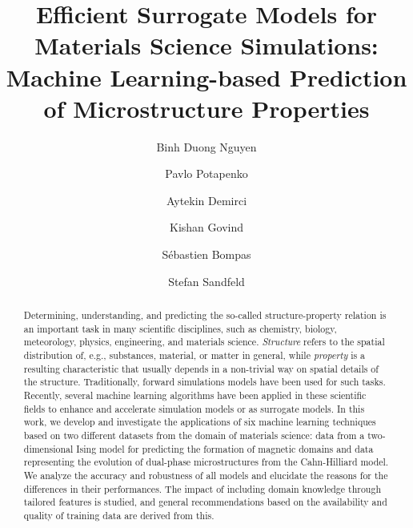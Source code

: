 \documentclass[11pt, authoryear]{elsarticle}
\begin{document}
	\begin{frontmatter}
		\title{%
			Efficient Surrogate Models for Materials Science Simulations: 
			Machine Learning-based Prediction of Microstructure Properties
		}
		
		\author[fzj,one]{Binh Duong Nguyen}
		\author[fzj,two]{Pavlo Potapenko}
		\author[fzj,three]{Aytekin Demirci}
		\author[fzj,fourth]{Kishan Govind}
		\author[fzj,fifth]{S\'ebastien Bompas}
		\author[fzj,rwth,corr]{Stefan Sandfeld}				
		
		\address[fzj]{%
			Institute for Advanced Simulations -- Materials Data Science and Informatics 
			(IAS-9), Forschungszentrum J\"ulich GmbH, 52425 J\"ulich, Germany
		}
		\address[rwth]{%
			Chair of Materials Data Science and Materials Informatics, 
			Faculty 5 -- Georesources and Materials Engineering, 
			RWTH Aachen University, 52056 Aachen, Germany
		}
		\address[one]{%
			first author's email address: bi.nguyen@fz-juelich.de
		}
		\address[two]{%
			second author's email address: p.potapenko@fz-juelich.de
		}
		\address[three]{%
			third author's email address: a.demirci@fz-juelich.de
		}
		\address[fourth]{%
			fourth author's email address: k.govind@fz-juelich.de
		}
		\address[fifth]{%
			fifth author's email address: s.bompas@fz-juelich.de
		}
		\address[corr]{%
			corresponding author's email address: s.sandfeld@fz-juelich.de
		}
		
		\begin{abstract}
			Determining, understanding, and predicting the so-called structure-property relation 
			is an important task in many scientific disciplines, such  as chemistry, biology, 
			meteorology, physics, engineering, and materials science. \emph{Structure} refers to 
			the spatial distribution of, e.g., substances, material, or matter in general, while
			\emph{property} is a resulting characteristic that usually depends in a non-trivial 
			way on spatial details of the structure. Traditionally, forward simulations
			models have been used for such tasks.
			Recently, several machine learning algorithms have been applied in these scientific 
			fields to enhance and accelerate simulation models or as surrogate models. 
			In this work, we develop and investigate the applications of six machine learning 
			techniques based on two different datasets from the domain of materials science: 
			data from a two-dimensional Ising model for predicting
			the formation of magnetic domains and data representing the evolution of dual-phase
			microstructures from the Cahn-Hilliard model.
			We analyze the accuracy and robustness of all models and elucidate the reasons for
			the differences in their performances. The impact of including domain knowledge through 
			tailored features is studied, and general recommendations based on the availability and 
			quality of training data are derived from this. 
		\end{abstract}
		

\end{frontmatter}
\end{document}
